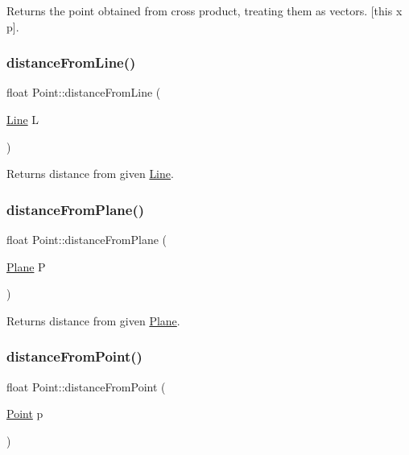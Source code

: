 Returns the point obtained from cross product, treating them as vectors. \mbox{[}this x p\mbox{]}. 

\mbox{\label{class_point_a4975f26f6258a4d5ebd57d180f7677fd}} 
\subsubsection{\texorpdfstring{distance\+From\+Line()}{distanceFromLine()}}
{\footnotesize\ttfamily float Point\+::distance\+From\+Line (\begin{DoxyParamCaption}\item[{\mbox{\hyperlink{class_line}{Line}}}]{L }\end{DoxyParamCaption})}



Returns distance from given \mbox{\hyperlink{class_line}{Line}}. 

\mbox{\label{class_point_a965dffb2059032cc1ce8c1a33c4d6684}} 
\subsubsection{\texorpdfstring{distance\+From\+Plane()}{distanceFromPlane()}}
{\footnotesize\ttfamily float Point\+::distance\+From\+Plane (\begin{DoxyParamCaption}\item[{\mbox{\hyperlink{class_plane}{Plane}}}]{P }\end{DoxyParamCaption})}



Returns distance from given \mbox{\hyperlink{class_plane}{Plane}}. 

\mbox{\label{class_point_a94bcbad2f7120c466739610bfd84932c}} 
\subsubsection{\texorpdfstring{distance\+From\+Point()}{distanceFromPoint()}}
{\footnotesize\ttfamily float Point\+::distance\+From\+Point (\begin{DoxyParamCaption}\item[{\mbox{\hyperlink{class_point}{Point}}}]{p }\end{DoxyParamCaption})}



